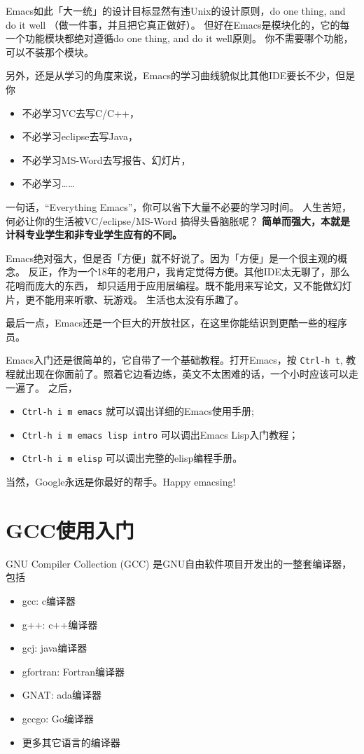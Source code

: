 \documentclass{wx672article}
\begin{document}
Emacs如此「大一统」的设计目标显然有违Unix的设计原则，do one thing, and do it well
（做一件事，并且把它真正做好）。
但好在Emacs是模块化的，它的每一个功能模块都绝对遵循do one thing, and do it well原则。
你不需要哪个功能，可以不装那个模块。

另外，还是从学习的角度来说，Emacs的学习曲线貌似比其他IDE要长不少，但是你
\begin{itemize}
\item 不必学习VC去写C/C++，
\item 不必学习eclipse去写Java，
\item 不必学习MS-Word去写报告、幻灯片，
\item 不必学习……
\end{itemize}

一句话，``Everything Emacs''，你可以省下大量不必要的学习时间。
人生苦短，何必让你的生活被VC/eclipse/MS-Word 搞得头昏脑胀呢？
\textbf{简单而强大，本就是计科专业学生和非专业学生应有的不同。} 

Emacs绝对强大，但是否「方便」就不好说了。因为「方便」是一个很主观的概念。
反正，作为一个18年的老用户，我肯定觉得方便。其他IDE太无聊了，那么花哨而庞大的东西，
却只适用于应用层编程。既不能用来写论文，又不能做幻灯片，更不能用来听歌、玩游戏。
生活也太没有乐趣了。

最后一点，Emacs还是一个巨大的开放社区，在这里你能结识到更酷一些的程序员。

Emacs入门还是很简单的，它自带了一个基础教程。打开Emacs，按 \texttt{Ctrl-h t},
教程就出现在你面前了。照着它边看边练，英文不太困难的话，一个小时应该可以走一遍了。
之后，
\begin{itemize}
\item \texttt{Ctrl-h i m emacs} 就可以调出详细的Emacs使用手册;
\item \texttt{Ctrl-h i m emacs lisp intro} 可以调出Emacs Lisp入门教程；
\item \texttt{Ctrl-h i m elisp} 可以调出完整的elisp编程手册。
\end{itemize}

当然，Google永远是你最好的帮手。Happy emacsing!

\section{GCC使用入门}

GNU Compiler Collection (GCC) 是GNU自由软件项目开发出的一整套编译器，包括
\begin{itemize}
\item gcc: c编译器
\item g++: c++编译器
\item gcj: java编译器
\item gfortran: Fortran编译器
\item GNAT: ada编译器
\item gccgo: Go编译器
\item 更多其它语言的编译器
\end{itemize}
\end{document}

